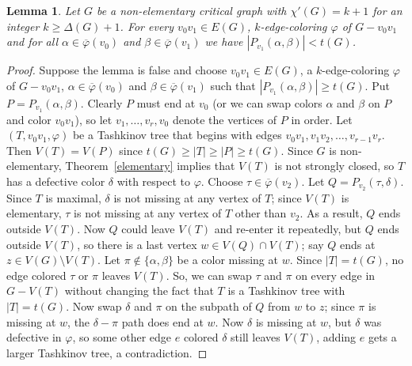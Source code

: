 \documentclass[12pt]{amsart}
\theoremstyle{plain}
\newtheorem{lem}[thm]{Lemma}
\theoremstyle{definition}
\theoremstyle{remark}
\newcommand{\vph}{\varphi}
\newcommand{\vphn}{\overline{\varphi}}
\begin{document}
\begin{lem}\label{FreeColorsLemma}
Let $G$ be a non-elementary critical graph with $\chi'(G) = k+1$ for an integer
$k \ge \Delta(G) + 1$.  For every $v_0v_1 \in E(G)$, $k$-edge-coloring $\vph$ of $G-v_0v_1$ and for all $\alpha \in \vphn(v_0)$ and $\beta \in
\vphn(v_1)$ we have $|P_{v_1}(\alpha, \beta)| < t(G)$.
\end{lem}
\begin{proof}
Suppose the lemma is false and choose $v_0v_1 \in E(G)$, a $k$-edge-coloring $\vph$ of $G-v_0v_1$, $\alpha \in \vphn(v_0)$ and $\beta \in
\vphn(v_1)$ such that $|P_{v_1}(\alpha, \beta)| \ge t(G)$.  Put $P = P_{v_1}(\alpha, \beta)$.  
Clearly $P$ must end at $v_0$ (or we can swap colors $\alpha$ and $\beta$ on $P$ and color $v_0v_1$), so let
$v_1,\ldots,v_r,v_0$ denote the vertices of $P$ in order. Let $(T, v_0v_1, \vph)$ be a Tashkinov tree that begins with edges
$v_0v_1, v_1v_2, \ldots, v_{r-1}v_r$.  Then $V(T)=V(P)$ since $t(G) \ge |T| \ge |P| \ge t(G)$.
Since $G$ is non-elementary, Theorem~\ref{elementary} implies that $V(T)$ is not
strongly closed, so $T$ has a defective color $\delta$ with respect to $\vph$.
Choose $\tau\in \vphn(v_2)$. Let $Q = P_{v_2}(\tau, \delta)$.
Since $T$ is maximal, $\delta$ is not missing at any vertex of $T$;
since $V(T)$ is elementary, $\tau$ is not missing at any vertex of $T$ other 
than $v_2$.  As a result, $Q$ ends outside $V(T)$.  Now $Q$ could leave
$V(T)$ and re-enter it repeatedly, but $Q$ ends outside $V(T)$, so there is a
last vertex $w \in V(Q) \cap V(T)$;
say $Q$ ends at $z \in V(G)\setminus V(T)$.  Let $\pi \notin \{\alpha, \beta\}$ be a
color missing at $w$.  Since
$|T| = t(G)$, no edge colored $\tau$ or $\pi$ leaves $V(T)$.  So, we can
swap $\tau$ and $\pi$ on every edge in $G - V(T)$ without changing the fact that $T$ is a Tashkinov tree with
$|T| = t(G)$.  Now swap $\delta$ and $\pi$ on the
subpath of $Q$ from $w$ to $z$;
since $\pi$ is missing at $w$, the $\delta-\pi$ path does end at $w$.  Now
$\delta$ is missing at $w$, but $\delta$ was defective in $\vph$, so some other
edge $e$ colored $\delta$ still leaves $V(T)$, adding $e$ gets a larger
Tashkinov tree, a contradiction.
\end{proof}
\end{document}
